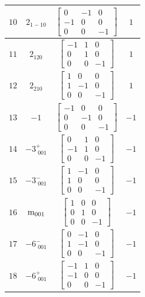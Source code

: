 \documentclass[fleqn,8pt]{jsarticle}
\begin{document}
\begin{longtable}{cccc}
$ 10 $ & $ 2{}_{1-10} $ & $ \begin{bmatrix} 0 & -1 & 0 \\ -1 & 0 & 0 \\ 0 & 0 & -1 \end{bmatrix} $ & $ 1 $ \\ \hline
$ 11 $ & $ 2{}_{120} $ & $ \begin{bmatrix} -1 & 1 & 0 \\ 0 & 1 & 0 \\ 0 & 0 & -1 \end{bmatrix} $ & $ 1 $ \\ \hline
$ 12 $ & $ 2{}_{210} $ & $ \begin{bmatrix} 1 & 0 & 0 \\ 1 & -1 & 0 \\ 0 & 0 & -1 \end{bmatrix} $ & $ 1 $ \\ \hline
$ 13 $ & $ -1 $ & $ \begin{bmatrix} -1 & 0 & 0 \\ 0 & -1 & 0 \\ 0 & 0 & -1 \end{bmatrix} $ & $ -1 $ \\ \hline
$ 14 $ & $ -3^{+}_{\,\,001} $ & $ \begin{bmatrix} 0 & 1 & 0 \\ -1 & 1 & 0 \\ 0 & 0 & -1 \end{bmatrix} $ & $ -1 $ \\ \hline
$ 15 $ & $ -3^{-}_{\,\,001} $ & $ \begin{bmatrix} 1 & -1 & 0 \\ 1 & 0 & 0 \\ 0 & 0 & -1 \end{bmatrix} $ & $ -1 $ \\ \hline
$ 16 $ & $ {\rm m}_{001} $ & $ \begin{bmatrix} 1 & 0 & 0 \\ 0 & 1 & 0 \\ 0 & 0 & -1 \end{bmatrix} $ & $ -1 $ \\ \hline
$ 17 $ & $ -6^{-}_{\,\,001} $ & $ \begin{bmatrix} 0 & -1 & 0 \\ 1 & -1 & 0 \\ 0 & 0 & -1 \end{bmatrix} $ & $ -1 $ \\ \hline
$ 18 $ & $ -6^{+}_{\,\,001} $ & $ \begin{bmatrix} -1 & 1 & 0 \\ -1 & 0 & 0 \\ 0 & 0 & -1 \end{bmatrix} $ & $ -1 $ \\ \hline

\end{longtable}
\end{document}

